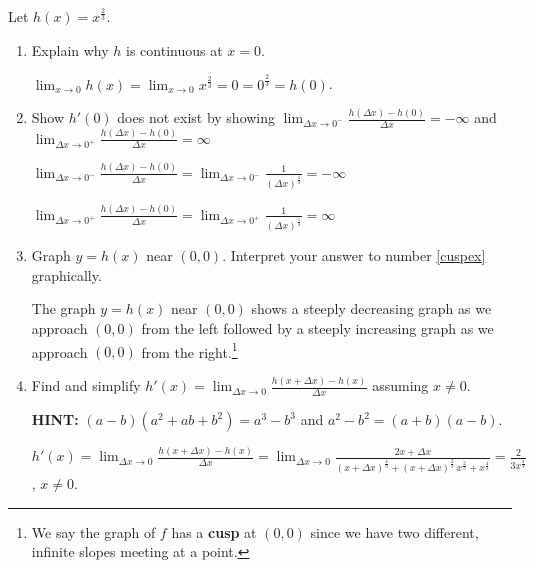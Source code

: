 \documentclass{ximera}
\begin{document}
\begin{problem} Let  $h(x) = x^{\frac{2}{3}}$.  

\begin{enumerate}

\item Explain why $h$ is continuous at $x = 0$.

\begin{solution}
$\lim_{x \rightarrow 0} h(x) = \lim_{x \rightarrow 0} x^{\frac{2}{3}} = 0 = 0^{\frac{2}{3}} = h(0)$. 
\end{solution}

\item\label{cuspex} Show $h'(0)$ does not exist by showing $\lim_{\Delta x \rightarrow 0^{-}} \frac{h(\Delta x) - h(0)}{\Delta x} = -\infty$ and $\lim_{\Delta x \rightarrow 0^{+}} \frac{h(\Delta x) - h(0)}{\Delta x} = \infty$

\begin{solution}
$\lim_{\Delta x \rightarrow 0^{-}} \frac{h(\Delta x) - h(0)}{\Delta x} = \lim_{\Delta x \rightarrow 0^{-}} \frac{1}{(\Delta x)^{\frac{1}{3}}} = -\infty$

$\lim_{\Delta x \rightarrow 0^{+}} \frac{h(\Delta x) - h(0)}{\Delta x} = \lim_{\Delta x \rightarrow 0^{+}} \frac{1}{(\Delta x)^{\frac{1}{3}}} = \infty$
\end{solution}
  
\item  Graph $y = h(x)$ near $(0,0)$.  Interpret your answer to number \ref{cuspex} graphically.

\begin{solution}
 The graph $y = h(x)$ near $(0,0)$ shows a steeply decreasing graph as we approach $(0,0)$ from the left followed by a steeply increasing graph as we approach $(0,0)$ from the right.\footnote{We say the graph of $f$ has a  \textbf{cusp} at $(0,0)$ since we have two different, infinite slopes meeting at a point.}
\end{solution}

\item  Find and simplify  $h'(x) =  \lim_{\Delta x \rightarrow 0} \frac{h(x+\Delta x) - h(x)}{\Delta x}$ assuming $x \neq 0$.

\textbf{HINT:}  $(a-b)\left(a^2+ab+b^2\right) = a^3 - b^3$ and $a^2 - b^2 = (a+b)(a-b)$.

\begin{solution}
$h'(x) =  \lim_{\Delta x \rightarrow 0} \frac{h(x+\Delta x) - h(x)}{\Delta x} = \lim_{\Delta x \rightarrow 0} \frac{2x + \Delta x}{(x+\Delta x)^{\frac{4}{3}} + (x+\Delta x)^{\frac{2}{3}} \, x^{\frac{2}{3}} + x^{\frac{4}{3}}} = \frac{2}{3x^{\frac{1}{3}}}$, $x \neq 0$.
\end{solution}
\end{enumerate}

\end{problem}
\end{document}

